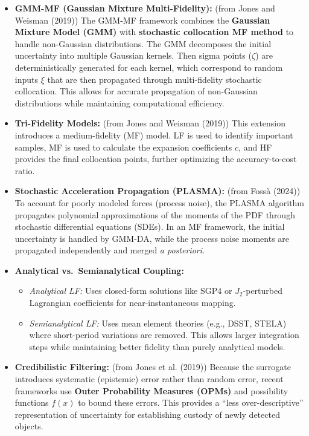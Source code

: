 \documentclass[
  letterpaper,
  DIV=11,
  numbers=noendperiod,
  oneside]{scrartcl}
\begin{document}
\begin{itemize}
\item
  \textbf{GMM-MF (Gaussian Mixture Multi-Fidelity):} (from Jones and
  Weisman (2019)) The GMM-MF framework combines the \textbf{Gaussian
  Mixture Model (GMM)} with \textbf{stochastic collocation MF method} to
  handle non-Gaussian distributions. The GMM decomposes the initial
  uncertainty into multiple Gaussian kernels. Then sigma points
  (\(\zeta\)) are deterministically generated for each kernel, which
  correspond to random inputs \(\xi\) that are then propagated through
  multi-fidelity stochastic collocation. This allows for accurate
  propagation of non-Gaussian distributions while maintaining
  computational efficiency.
\item
  \textbf{Tri-Fidelity Models:} (from Jones and Weisman (2019)) This
  extension introduces a medium-fidelity (MF) model. LF is used to
  identify important samples, MF is used to calculate the expansion
  coefficients \(c\), and HF provides the final collocation points,
  further optimizing the accuracy-to-cost ratio.
\item
  \textbf{Stochastic Acceleration Propagation (PLASMA):} (from Fossà
  (2024)) To account for poorly modeled forces (process noise), the
  PLASMA algorithm propagates polynomial approximations of the moments
  of the PDF through stochastic differential equations (SDEs). In an MF
  framework, the initial uncertainty is handled by GMM-DA, while the
  process noise moments are propagated independently and merged \emph{a
  posteriori}.
\item
  \textbf{Analytical vs.~Semianalytical Coupling:}

  \begin{itemize}
  \item
    \emph{Analytical LF:} Uses closed-form solutions like SGP4 or
    \(J_2\)-perturbed Lagrangian coefficients for near-instantaneous
    mapping.
  \item
    \emph{Semianalytical LF:} Uses mean element theories (e.g., DSST,
    STELA) where short-period variations are removed. This allows larger
    integration steps while maintaining better fidelity than purely
    analytical models.
  \end{itemize}
\item
  \textbf{Credibilistic Filtering:} (from Jones et al. (2019)) Because
  the surrogate introduces systematic (epistemic) error rather than
  random error, recent frameworks use \textbf{Outer Probability Measures
  (OPMs)} and possibility functions \(f(x)\) to bound these errors. This
  provides a ``less over-descriptive'' representation of uncertainty for
  establishing custody of newly detected objects.
\end{itemize}
\end{document}
